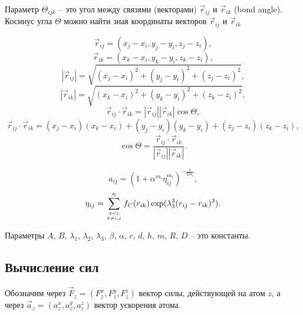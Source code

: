 Параметр $\Theta_{ijk}$ -- это угол между связями (векторами) $\vec{r}_{ij}$ и $\vec{r}_{ik}$ (bond angle). Косинус угла $\Theta$ можно найти зная координаты 
векторов $\vec{r}_{ij}$ и  $\vec{r}_{ik}$

\begin{equation}
\vec{r}_{ij} = (x_j - x_i, y_j - y_i, z_j - z_i), 
\end{equation}
\begin{equation}
\vec{r}_{ik} = (x_k - x_i, y_k - y_i, z_k - z_i), 
\end{equation}
\begin{equation}
|\vec{r}_{ij}| = \sqrt{(x_j - x_i)^2 + (y_j - y_i)^2 + (z_j - z_i)^2}, 
\end{equation}
\begin{equation}
|\vec{r}_{ik}| = \sqrt{(x_k - x_i)^2 + (y_k - y_i)^2 + (z_k - z_i)^2}, 
\end{equation}
\begin{equation}
\vec{r}_{ij} \cdot \vec{r}_{ik} = |\vec{r}_{ij}| |\vec{r}_{ik}| \cos\Theta , 
\end{equation}
\begin{equation}
\vec{r}_{ij} \cdot \vec{r}_{ik} = (x_j - x_i)(x_k - x_i) + (y_j - y_i)(y_k - y_i) + (z_j - z_i)(z_k - z_i),
\end{equation}
\begin{equation}
\cos\Theta = \frac{\vec{r}_{ij} \cdot \vec{r}_{ik}} {|\vec{r}_{ij}| |\vec{r}_{ik}|}.
\end{equation}

\begin{equation}
a_{ij} = (1 + \alpha^{m_i} \eta_{ij}^{m_i}) ^ {-\frac{1}{2m_i}},
\end{equation}
\begin{equation}
\eta_{ij} = \displaystyle\sum_{k=1 \atop k \neq i, j}^{n}f_C(r_{ik})\exp(\lambda_{3}^{3}(r_{ij} - r_{ik})^3).
\end{equation}

Параметры $A$, $B$,  $\lambda_1$,  $\lambda_2$,  $\lambda_3$,  $\beta$, $\alpha$, $c$, $d$,  $h$, $m$, $R$, $D$ -- это константы.

\subsection{Вычисление сил}

Обозначим через $\vec{F}_z = (F_{z}^{x}, F_{z}^{y}, F_{z}^{z})$ вектор силы, действующей на атом $z$, а через $\vec{a}_z = (a_{z}^{x}, a_{z}^{y}, a_{z}^{z})$ вектор ускорения атома. 

